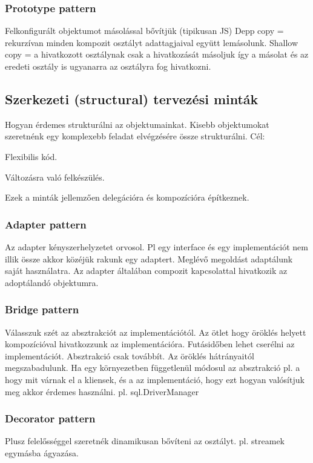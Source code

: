 \documentclass[a4paper,14pt]{extarticle}
\begin{document}
			\subsubsection{Prototype pattern}
			Felkonfigurált objektumot másolással bővítjük (tipikusan JS)
			\newline Depp copy = rekurzívan minden kompozit osztályt adattagjaival együtt lemásolunk. \newline Shallow copy = a hivatkozott osztálynak csak a hivatkozását másoljuk így a másolat és az eredeti osztály is ugyanarra az osztályra fog hivatkozni. 
			
		\subsection{Szerkezeti (structural) tervezési minták}
		Hogyan érdemes strukturálni az objektumainkat.
		Kisebb objektumokat szeretnénk egy komplexebb feladat elvégzésére össze strukturálni.
		\newline Cél:
		\begin{compactitem}
			\item Flexibilis kód.
			\item Változásra való felkészülés.
		\end{compactitem}
		Ezek a minták  jellemzően delegációra és kompozícióra építkeznek.
			\subsubsection{Adapter pattern}
			Az adapter kényszerhelyzetet orvosol. Pl egy interface és egy implementációt nem illik össze akkor közéjük rakunk egy adaptert. Meglévő megoldást adaptálunk saját használatra.
			Az adapter általában compozit kapcsolattal hivatkozik az adoptálandó objektumra. 
			
			\subsubsection{Bridge pattern}
			Válasszuk szét az absztrakciót az implementációtól.
			Az ötlet hogy öröklés helyett kompozícióval hivatkozzunk az implementációra. Futásidőben lehet cserélni az implementációt.
			Absztrakció csak továbbít. Az öröklés hátrányaitól megszabadulunk. Ha egy környezetben függetlenül módosul az absztrakció pl. a hogy mit várnak el a kliensek, és a az implementáció, hogy ezt hogyan valósítjuk meg akkor érdemes használni.
			pl. sql.DriverManager
			
			\subsubsection{Decorator pattern}
			Plusz felelősséggel szeretnék dinamikusan bővíteni az osztályt. pl. streamek egymásba ágyazása.
			
\end{document}
